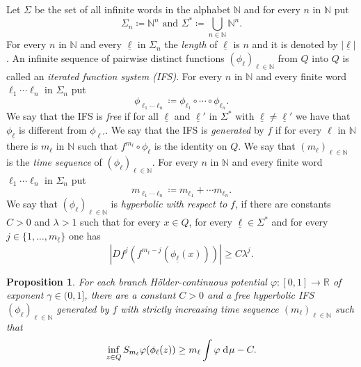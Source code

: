 \documentclass[12pt]{amsart}
\numberwithin{equation}{section} %
\numberwithin{figure}{section} %
\theoremstyle{plain}
\newtheorem{prop}{Proposition}[section]
\theoremstyle{definition}
\theoremstyle{remark}
\theoremstyle{citing}
\newcommand{\N}{\mathbb{N}}
\newcommand{\R}{\mathbb{R}}
\renewcommand{\=}{\coloneqq}
\newcommand{\dd}{\hspace{1pt}\operatorname{d}\hspace{-1pt}}
\begin{document}
Let $\Sigma$ be the set of all infinite words in the alphabet $\N$ and for every $n$ in $\N$ put 
\begin{equation*}
    \Sigma_n\=\N^n \text{ and } \Sigma^*\=\bigcup_{n\in\N} \N^n.
\end{equation*}
For every $n$ in $\N$ and every $\underline{\ell}$ in $\Sigma_n$ the \emph{length} of $\underline{\ell}$ is $n$ and it is denoted by $|\underline{\ell}|$. An infinite sequence of pairwise distinct functions $(\phi_\ell)_{\ell\in\N}$ from $Q$ into $Q$ is called an \emph{iterated function system (IFS)}. For every $n$ in $\N$ and every finite word $\ell_1\cdots\ell_n$ in $\Sigma_n$ put 
\begin{equation}
    \phi_{\ell_1\cdots \ell_n} \= \phi_{\ell_1}\circ\cdots \circ\phi_{\ell_n}.
\end{equation}
We say that the IFS is \emph{free} if for all $\underline{\ell}$ and $\underline{\ell}'$ in $\Sigma^*$ with $\underline{\ell}\neq \underline{\ell}'$ we have that $\phi_{\underline{\ell}}$ is different from $\phi_{\underline{\ell}'}$. We say that the IFS is \emph{generated} by $f$ if for every $\ell$ in $\N$ there is $m_{\ell}$ in $\N$ such that $f^{m_\ell}\circ \phi_{\ell}$ is the identity on  $Q$. We say that $(m_\ell)_{\ell\in\N}$ is the \emph{time sequence} of $(\phi_{\ell})_{\ell\in\N}$. For every $n$ in $\N$ and every finite word $\ell_1\cdots\ell_n$ in $\Sigma_n$ put 
\begin{equation}
    m_{\ell_1\cdots\ell_n}\= m_{\ell_1}+\cdots m_{\ell_n}.
\end{equation}
We say that $(\phi_{\ell})_{\ell\in\N}$ is \emph{hyperbolic with respect to} $f$, if there are constants $C>0$ and $\lambda>1$ such that for every $x\in Q$, for every $\underline{\ell}\in\Sigma^*$ and for every $j\in\{1,\ldots,m_{\underline{\ell}}\}$ one has
\begin{equation}\label{eq hyperbolic IFS}
    |Df^{j}(f^{m_{\underline{\ell}}-j}(\phi_{\underline{\ell}}(x)))|\geq C\lambda^j.
\end{equation}
\begin{prop}\label{prop key lemma}
    For each branch Hölder-continuous potential $\varphi:[0,1]\to \R$ of exponent $\gamma\in(0,1]$, there are a constant $C>0$ and a free hyperbolic IFS $(\phi_{\ell})_{\ell\in \N}$ generated by $f$ with strictly increasing time sequence $(m_\ell)_{\ell\in\N}$ such that
    \begin{equation}\label{eq prop key lemma}
        \inf_{z\in Q} S_{m_\ell}\varphi(\phi_\ell(z)) \geq m_\ell \int \varphi \dd\mu - C.
    \end{equation}
\end{prop}
\noindent
\end{document}
